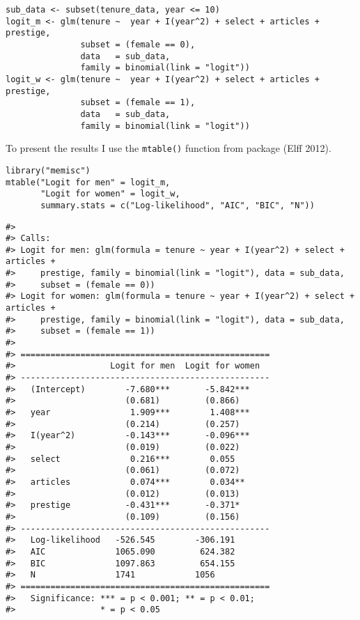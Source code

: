 \begin{verbatim}
sub_data <- subset(tenure_data, year <= 10)
logit_m <- glm(tenure ~  year + I(year^2) + select + articles + prestige, 
               subset = (female == 0),
               data   = sub_data,
               family = binomial(link = "logit"))
logit_w <- glm(tenure ~  year + I(year^2) + select + articles + prestige, 
               subset = (female == 1), 
               data   = sub_data, 
               family = binomial(link = "logit"))
\end{verbatim}

To present the results I use the \texttt{mtable()} function from  package (Elff 2012).

\begin{verbatim}
library("memisc")
mtable("Logit for men" = logit_m,
       "Logit for women" = logit_w, 
       summary.stats = c("Log-likelihood", "AIC", "BIC", "N"))
\end{verbatim}

\begin{verbatim}
#> 
#> Calls:
#> Logit for men: glm(formula = tenure ~ year + I(year^2) + select + articles + 
#>     prestige, family = binomial(link = "logit"), data = sub_data, 
#>     subset = (female == 0))
#> Logit for women: glm(formula = tenure ~ year + I(year^2) + select + articles + 
#>     prestige, family = binomial(link = "logit"), data = sub_data, 
#>     subset = (female == 1))
#> 
#> ==================================================
#>                   Logit for men  Logit for women  
#> --------------------------------------------------
#>   (Intercept)        -7.680***       -5.842***    
#>                      (0.681)         (0.866)      
#>   year                1.909***        1.408***    
#>                      (0.214)         (0.257)      
#>   I(year^2)          -0.143***       -0.096***    
#>                      (0.019)         (0.022)      
#>   select              0.216***        0.055       
#>                      (0.061)         (0.072)      
#>   articles            0.074***        0.034**     
#>                      (0.012)         (0.013)      
#>   prestige           -0.431***       -0.371*      
#>                      (0.109)         (0.156)      
#> --------------------------------------------------
#>   Log-likelihood   -526.545        -306.191       
#>   AIC              1065.090         624.382       
#>   BIC              1097.863         654.155       
#>   N                1741            1056           
#> ==================================================
#>   Significance: *** = p < 0.001; ** = p < 0.01;   
#>                 * = p < 0.05
\end{verbatim}

